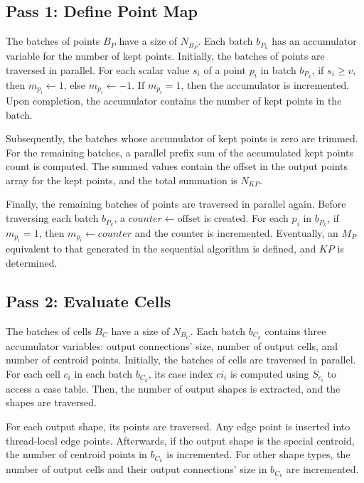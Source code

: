 \documentclass{egpubl}
\begin{document}
\subsection{Pass 1: Define Point Map}
\label{sec:par-pass-1}

The batches of points $B_P$ have a size of $N_{B_P}$. Each batch $b_{P_k}$ has an accumulator variable for the number of kept points. Initially, the batches of points are traversed in parallel. For each scalar value $s_i$ of a point $p_i$ in batch $b_{P_k}$, if $s_i \ge v$, then $m_{p_i} \gets 1$, else $m_{p_i} \gets -1$. If $m_{p_i} = 1$, then the accumulator is incremented. Upon completion, the accumulator contains the number of kept points in the batch.

Subsequently, the batches whose accumulator of kept points is zero are trimmed. For the remaining batches, a parallel prefix sum of the accumulated kept points count is computed. The summed values contain the offset in the output points array for the kept points, and the total summation is $N_{KP}$.

Finally, the remaining batches of points are traversed in parallel again. Before traversing each batch $b_{P_k}$, a $counter \gets \text{offset}$ is created. For each $p_i$ in $b_{P_k}$, if $m_{p_i} = 1$, then $m_{p_i} \gets counter$ and the counter is incremented. Eventually, an $M_P$ equivalent to that generated in the sequential algorithm is defined, and $KP$ is determined.

\subsection{Pass 2: Evaluate Cells}

The batches of cells $B_C$ have a size of $N_{B_C}$. Each batch $b_{C_k}$ contains three accumulator variables: output connections' size, number of output cells, and number of centroid points. Initially, the batches of cells are traversed in parallel. For each cell $c_i$ in each batch $b_{C_k}$, its case index $ci_i$ is computed using $S_{c_i}$ to access a case table. Then, the number of output shapes is extracted, and the shapes are traversed.

For each output shape, its points are traversed. Any edge point is inserted into thread-local edge points. Afterwards, if the output shape is the special centroid, the number of centroid points in $b_{C_k}$ is incremented. For other shape types, the number of output cells and their output connections' size in $b_{C_k}$ are incremented.
\end{document}
